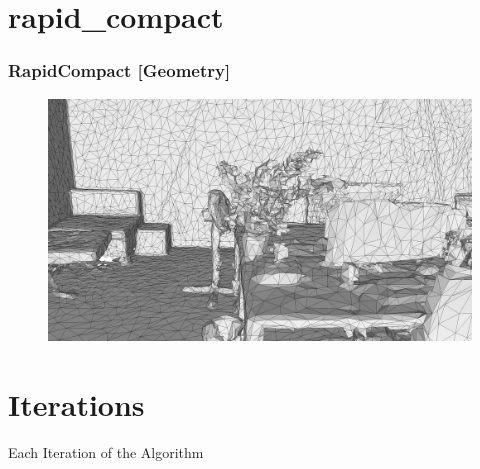 \documentclass[
	10pt,
	t		%
]{beamer}
\begin{document}
\section{rapid_compact}
\begin{frame}
\frametitle{RapidCompact [Geometry]}
\begin{figure}[ht]
\centering
\includegraphics[width=1\textwidth]{rapid_compact}
\end{figure}
\end{frame}

\section{Iterations}
\begin{frame}{Each Iteration of the Algorithm}
\end{frame}
\end{document}
